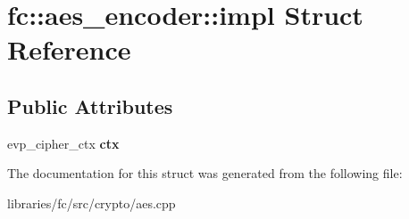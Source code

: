 \hypertarget{structfc_1_1aes__encoder_1_1impl}{}\section{fc\+:\+:aes\+\_\+encoder\+:\+:impl Struct Reference}
\label{structfc_1_1aes__encoder_1_1impl}
\subsection*{Public Attributes}
\begin{DoxyCompactItemize}
\item 
\mbox{\label{structfc_1_1aes__encoder_1_1impl_ad7f1f31c3e3825b834a6c7418e584085}} 
evp\+\_\+cipher\+\_\+ctx {\bfseries ctx}
\end{DoxyCompactItemize}


The documentation for this struct was generated from the following file\+:\begin{DoxyCompactItemize}
\item 
libraries/fc/src/crypto/aes.\+cpp\end{DoxyCompactItemize}
